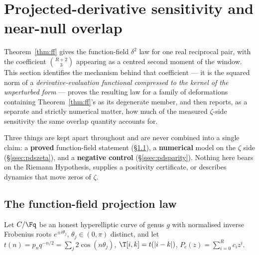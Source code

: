 \section{Projected-derivative sensitivity and near-null overlap}\label{sec:pds}

Theorem~\ref{thm:ff} gives the function-field $\delta^{2}$ law for one real reciprocal
pair, with the coefficient $\binom{R+2}{3}$ appearing as a centred second moment of the
window. This section identifies the mechanism behind that coefficient --- it is the squared
norm of a \emph{derivative-evaluation functional compressed to the kernel of the
unperturbed form} --- proves the resulting law for a family of deformations containing
Theorem~\ref{thm:ff}'s as its degenerate member, and then reports, as a separate and
strictly numerical matter, how much of the measured $\zeta$-side sensitivity the same
overlap quantity accounts for.

Three things are kept apart throughout and are never combined into a single claim: a
\textbf{proved} function-field statement (\S\ref{ssec:pdsff}), a \textbf{numerical} model
on the $\zeta$ side (\S\ref{ssec:pdszeta}), and a \textbf{negative control}
(\S\ref{ssec:pdsparity}). Nothing here bears on the Riemann Hypothesis, supplies a
positivity certificate, or describes dynamics that move zeros of $\zeta$.

\subsection{The function-field projection law}\label{ssec:pdsff}

Let $C/\Fq$ be an honest hyperelliptic curve of genus $g$ with normalised inverse Frobenius
roots $e^{\pm i\theta_j}$, $\theta_j\in(0,\pi)$ distinct, and let
$t(n)=p_nq^{-n/2}=\sum_{j}2\cos(n\theta_j)$, $\T[i,k]=t(|i-k|)$, $P_c(z)=\sum_{i=0}^{R}c_iz^i$.


